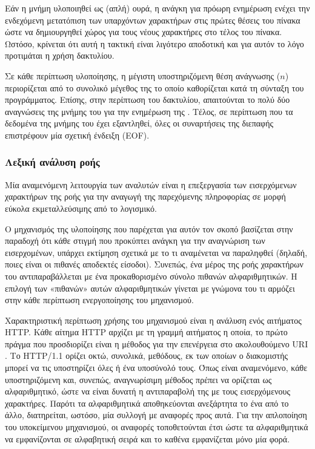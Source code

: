 Εάν η μνήμη  υλοποιηθεί ως (απλή) ουρά, η ανάγκη για πρόωρη ενημέρωση
ενέχει την ενδεχόμενη μετατόπιση των υπαρχόντων χαρακτήρων στις πρώτες θέσεις
του πίνακα ώστε να δημιουργηθεί χώρος για τους νέους χαρακτήρες στο τέλος του
πίνακα. Ωστόσο, κρίνεται ότι αυτή η τακτική είναι λιγότερο αποδοτική και για
αυτόν το λόγο προτιμάται η χρήση δακτυλίου.

Σε κάθε περίπτωση υλοποίησης, η μέγιστη υποστηριζόμενη θέση ανάγνωσης ($n$)
περιορίζεται από το συνολικό μέγεθος της  το οποίο καθορίζεται κατά τη
σύνταξη του προγράμματος. Επίσης, στην περίπτωση του δακτυλίου, απαιτούνται το
πολύ δύο αναγνώσεις της μνήμης του  για την ενημέρωση της .
Τέλος, σε περίπτωση που τα δεδομένα της μνήμης του  έχει εξαντληθεί,
όλες οι συναρτήσεις της διεπαφής επιστρέφουν μία σχετική ένδειξη (EOF).


\subsubsection{Λεξική ανάλυση ροής}
\label{ssubsec:network:stream-match}

Μία αναμενόμενη λειτουργία των αναλυτών είναι η επεξεργασία των εισερχόμενων
χαρακτήρων της ροής για την αναγωγή της παρεχόμενης πληροφορίας σε μορφή εύκολα
εκμεταλλεύσιμης από το λογισμικό.

Ο μηχανισμός της υλοποίησης που παρέχεται για αυτόν τον σκοπό βασίζεται στην
παραδοχή ότι κάθε στιγμή που προκύπτει ανάγκη για την αναγνώριση των
εισερχομένων, υπάρχει εκτίμηση σχετικά με το τι αναμένεται να παραληφθεί
(δηλαδή, ποιες είναι οι πιθανές αποδεκτές είσοδοι). Συνεπώς, ένα μέρος της ροής
χαρακτήρων του  αντιπαραβάλλεται με ένα προκαθορισμένο σύνολο πιθανών
αλφαριθμητικών. Η επιλογή των «πιθανών» αυτών αλφαριθμητικών γίνεται με γνώμονα
του τι αρμόζει στην κάθε περίπτωση ενεργοποίησης του μηχανισμού.

Χαρακτηριστική περίπτωση χρήσης του μηχανισμού είναι η ανάλυση ενός αιτήματος
HTTP. Κάθε αίτημα HTTP αρχίζει με τη γραμμή αιτήματος η οποία, το πρώτο πράγμα
που προσδιορίζει είναι η μέθοδος για την επενέργεια στο ακολουθούμενο URI
\parencite[35]{rfc2616}. Το HTTP/1.1 ορίζει οκτώ, συνολικά, μεθόδους, εκ
των οποίων ο διακομιστής μπορεί να τις υποστηρίζει όλες ή ένα υποσύνολό τους.
Όπως είναι αναμενόμενο, κάθε υποστηριζόμενη και, συνεπώς, αναγνωρίσιμη μέθοδος
πρέπει να ορίζεται ως αλφαριθμητικό, ώστε να είναι δυνατή η αντιπαραβολή της με
τους εισερχόμενους χαρακτήρες. Παρότι τα αλφαριθμητικά αποθηκεύονται ανεξάρτητα
το ένα από το άλλο, διατηρείται, ωστόσο, μία συλλογή με αναφορές προς αυτά.
Για την απλοποίηση του υποκείμενου μηχανισμού, οι αναφορές τοποθετούνται έτσι
ώστε τα αλφαριθμητικά να εμφανίζονται σε αλφαβητική σειρά και το καθένα
εμφανίζεται μόνο μία φορά.

